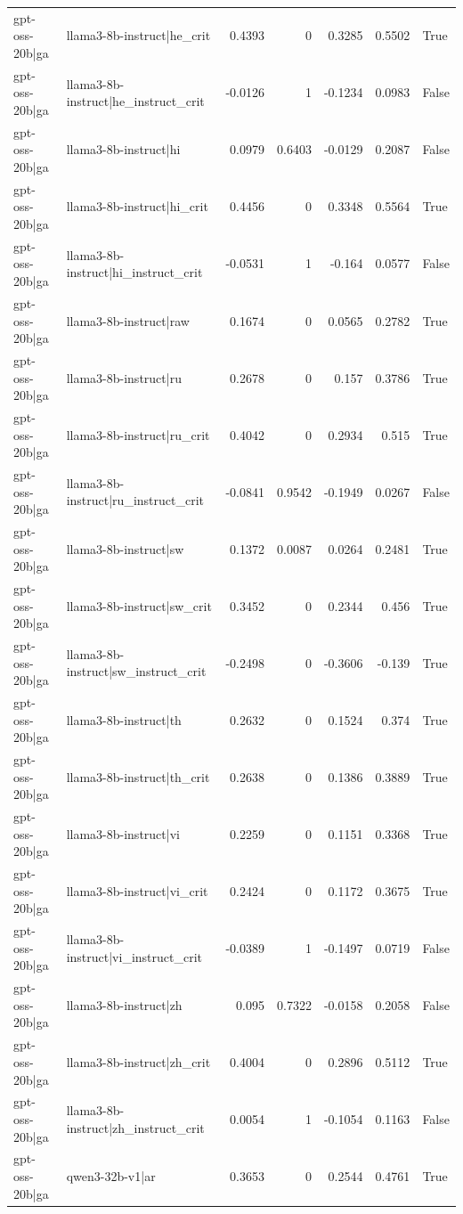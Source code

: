 \begin{table}
\begin{tabular}{l l r r r r l}
gpt-oss-20b|ga & llama3-8b-instruct|he_crit & 0.4393 & 0 & 0.3285 & 0.5502 & True \\
gpt-oss-20b|ga & llama3-8b-instruct|he_instruct_crit & -0.0126 & 1 & -0.1234 & 0.0983 & False \\
gpt-oss-20b|ga & llama3-8b-instruct|hi & 0.0979 & 0.6403 & -0.0129 & 0.2087 & False \\
gpt-oss-20b|ga & llama3-8b-instruct|hi_crit & 0.4456 & 0 & 0.3348 & 0.5564 & True \\
gpt-oss-20b|ga & llama3-8b-instruct|hi_instruct_crit & -0.0531 & 1 & -0.164 & 0.0577 & False \\
gpt-oss-20b|ga & llama3-8b-instruct|raw & 0.1674 & 0 & 0.0565 & 0.2782 & True \\
gpt-oss-20b|ga & llama3-8b-instruct|ru & 0.2678 & 0 & 0.157 & 0.3786 & True \\
gpt-oss-20b|ga & llama3-8b-instruct|ru_crit & 0.4042 & 0 & 0.2934 & 0.515 & True \\
gpt-oss-20b|ga & llama3-8b-instruct|ru_instruct_crit & -0.0841 & 0.9542 & -0.1949 & 0.0267 & False \\
gpt-oss-20b|ga & llama3-8b-instruct|sw & 0.1372 & 0.0087 & 0.0264 & 0.2481 & True \\
gpt-oss-20b|ga & llama3-8b-instruct|sw_crit & 0.3452 & 0 & 0.2344 & 0.456 & True \\
gpt-oss-20b|ga & llama3-8b-instruct|sw_instruct_crit & -0.2498 & 0 & -0.3606 & -0.139 & True \\
gpt-oss-20b|ga & llama3-8b-instruct|th & 0.2632 & 0 & 0.1524 & 0.374 & True \\
gpt-oss-20b|ga & llama3-8b-instruct|th_crit & 0.2638 & 0 & 0.1386 & 0.3889 & True \\
gpt-oss-20b|ga & llama3-8b-instruct|vi & 0.2259 & 0 & 0.1151 & 0.3368 & True \\
gpt-oss-20b|ga & llama3-8b-instruct|vi_crit & 0.2424 & 0 & 0.1172 & 0.3675 & True \\
gpt-oss-20b|ga & llama3-8b-instruct|vi_instruct_crit & -0.0389 & 1 & -0.1497 & 0.0719 & False \\
gpt-oss-20b|ga & llama3-8b-instruct|zh & 0.095 & 0.7322 & -0.0158 & 0.2058 & False \\
gpt-oss-20b|ga & llama3-8b-instruct|zh_crit & 0.4004 & 0 & 0.2896 & 0.5112 & True \\
gpt-oss-20b|ga & llama3-8b-instruct|zh_instruct_crit & 0.0054 & 1 & -0.1054 & 0.1163 & False \\
gpt-oss-20b|ga & qwen3-32b-v1|ar & 0.3653 & 0 & 0.2544 & 0.4761 & True \\

\end{tabular}
\end{table}
